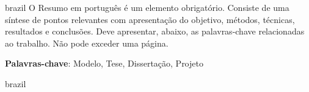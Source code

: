\begin{otherlanguage*}{brazil}
O Resumo em português é um elemento obrigatório. Consiste de uma síntese de pontos relevantes com apresentação do objetivo, métodos,
técnicas, resultados e conclusões. Deve apresentar, abaixo, as palavras-chave relacionadas ao trabalho. Não pode exceder uma página.

\vspace{\onelineskip}
 
\noindent 
 \textbf{Palavras-chave}: Modelo, Tese, Dissertação, Projeto
\end{otherlanguage*}{brazil}
